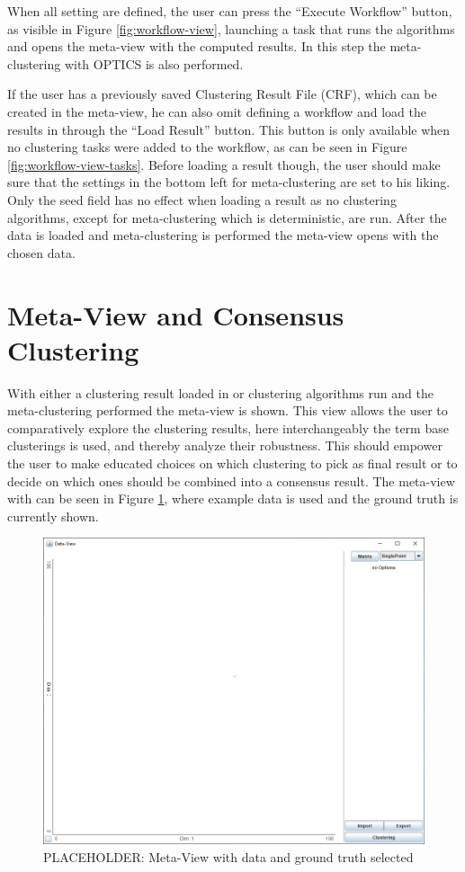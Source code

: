 \documentclass[
	a4paper,
	english,
	twoside,
	openright,               
	11pt                            
	]{report}
\begin{document}
When all setting are defined, the user can press the ``Execute Workflow'' button, as visible in Figure \ref{fig:workflow-view}, launching a task that runs the algorithms and opens the meta-view with the computed results. In this step the meta-clustering with OPTICS \cite{10.1145/304181.304187} is also performed.

If the user has a previously saved Clustering Result File (CRF), which can be created in the meta-view, he can also omit defining a workflow and load the results in through the ``Load Result'' button. This button is only available when no clustering tasks were added to the workflow, as can be seen in Figure \ref{fig:workflow-view-tasks}. Before loading a result though, the user should make sure that the settings in the bottom left for meta-clustering are set to his liking. Only the seed field has no effect when loading a result as no clustering algorithms, except for meta-clustering which is deterministic, are run. After the data is loaded and meta-clustering is performed the meta-view opens with the chosen data.

\section{Meta-View and Consensus Clustering}
With either a clustering result loaded in or clustering algorithms run and the meta-clustering performed the meta-view is shown. This view allows the user to comparatively explore the clustering results, here interchangeably the term base clusterings is used, and thereby analyze their robustness. This should empower the user to make educated choices on which clustering to pick as final result or to decide on which ones should be combined into a consensus result. The meta-view with can be seen in Figure \ref{fig:meta-view}, where example data is used and the ground truth is currently shown.

\begin{figure}[h]
	\centering
	\includegraphics[scale=.45]{data-view}
	\caption{PLACEHOLDER: Meta-View with data and ground truth selected}
	\label{fig:meta-view}
\end{figure}
\end{document}
